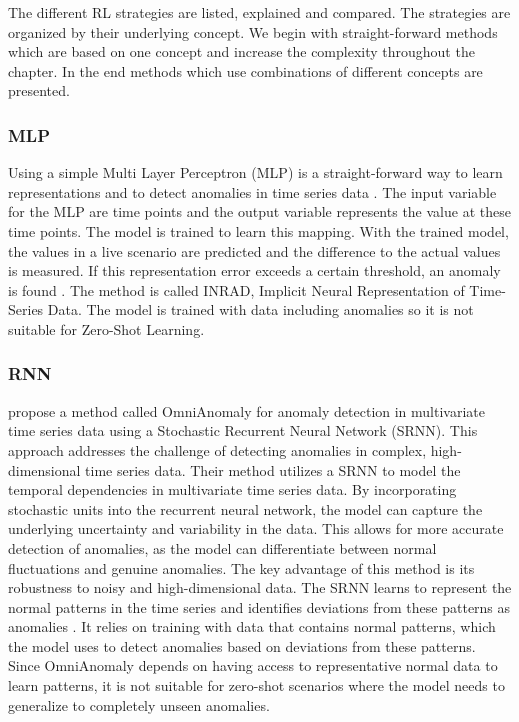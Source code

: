 The different RL strategies are listed, explained and compared. The strategies are organized by their underlying concept. We begin with straight-forward methods which are based on one concept and increase the complexity throughout the chapter. In the end methods which use combinations of different concepts are presented.

\subsubsection{MLP}
Using a simple Multi Layer Perceptron (MLP) is a straight-forward way to learn representations and to detect anomalies in time series data . The input variable for the MLP are time points and the output variable represents the value at these time points. The model is trained to learn this mapping. With the trained model, the values in a live scenario are predicted and the difference to the actual values is measured. If this representation error exceeds a certain threshold, an anomaly is found . The method is called INRAD, Implicit Neural Representation of Time-Series Data.
The model is trained with data including anomalies so it is not suitable for Zero-Shot Learning.

\subsubsection{RNN}
 propose a method called OmniAnomaly for anomaly detection in multivariate time series data using a Stochastic Recurrent Neural Network (SRNN). This approach addresses the challenge of detecting anomalies in complex, high-dimensional time series data.
Their method utilizes a SRNN to model the temporal dependencies in multivariate time series data. By incorporating stochastic units into the recurrent neural network, the model can capture the underlying uncertainty and variability in the data. This allows for more accurate detection of anomalies, as the model can differentiate between normal fluctuations and genuine anomalies.
The key advantage of this method is its robustness to noisy and high-dimensional data. The SRNN learns to represent the normal patterns in the time series and identifies deviations from these patterns as anomalies . It relies on training with data that contains normal patterns, which the model uses to detect anomalies based on deviations from these patterns. Since OmniAnomaly depends on having access to representative normal data to learn patterns, it is not suitable for zero-shot scenarios where the model needs to generalize to completely unseen anomalies.

